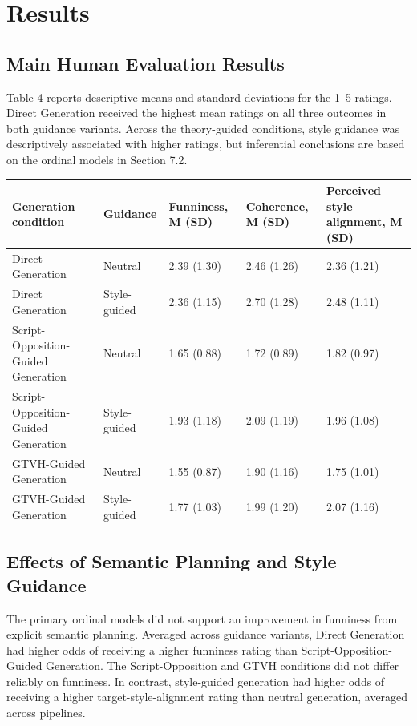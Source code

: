 \documentclass[11pt]{article}
\begin{document}
\section{Results}\label{results}

\subsection{Main Human Evaluation Results}\label{main-human-evaluation-results}

Table 4 reports descriptive means and standard deviations for the 1--5 ratings. Direct Generation received the highest mean ratings on all three outcomes in both guidance variants. Across the theory-guided conditions, style guidance was descriptively associated with higher ratings, but inferential conclusions are based on the ordinal models in Section 7.2.

\begin{table}[t]\centering\scriptsize\begin{tabularx}{\textwidth}{YYYYY}
\toprule\noalign{}
Generation condition & Guidance & Funniness, M (SD) & Coherence, M (SD) & Perceived style alignment, M (SD) \\
\midrule\noalign{}

\bottomrule\noalign{}

Direct Generation & Neutral & 2.39 (1.30) & 2.46 (1.26) & 2.36 (1.21) \\
Direct Generation & Style-guided & 2.36 (1.15) & 2.70 (1.28) & 2.48 (1.11) \\
Script-Opposition-Guided Generation & Neutral & 1.65 (0.88) & 1.72 (0.89) & 1.82 (0.97) \\
Script-Opposition-Guided Generation & Style-guided & 1.93 (1.18) & 2.09 (1.19) & 1.96 (1.08) \\
GTVH-Guided Generation & Neutral & 1.55 (0.87) & 1.90 (1.16) & 1.75 (1.01) \\
GTVH-Guided Generation & Style-guided & 1.77 (1.03) & 1.99 (1.20) & 2.07 (1.16) \\
\end{tabularx}\end{table}

\subsection{Effects of Semantic Planning and Style Guidance}\label{effects-of-semantic-planning-and-style-guidance}

The primary ordinal models did not support an improvement in funniness from explicit semantic planning. Averaged across guidance variants, Direct Generation had higher odds of receiving a higher funniness rating than Script-Opposition-Guided Generation. The Script-Opposition and GTVH conditions did not differ reliably on funniness. In contrast, style-guided generation had higher odds of receiving a higher target-style-alignment rating than neutral generation, averaged across pipelines.
\end{document}
